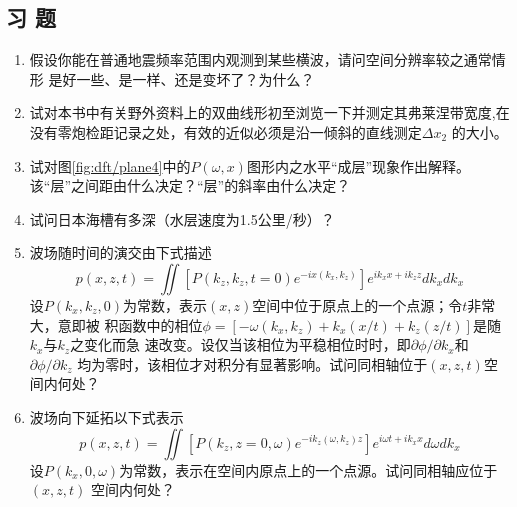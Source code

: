 \subsection{习 题}
\begin{enumerate}
\item
    假设你能在普通地震频率范围内观测到某些横波，请问空间分辨率较之通常情形
是好一些、是一样、还是变坏了？为什么？
\item 
    试对本书中有关野外资料上的双曲线形初至浏览一下并测定其弗莱涅带宽度,在
没有零炮检距记录之处，有效的近似必须是沿一倾斜的直线测定${\Delta x_{2}}$
的大小。
\item
试对图\ref{fig:dft/plane4}中的$P(\omega,x)$图形内之水平“成层”现象作出解释。
该“层”之间距由什么决定？“层”的斜率由什么决定？
\item 
试问日本海槽有多深（水层速度为1.5公里/秒）？
\item 
    波场随时间的演交由下式描述
\begin{equation*}
p(x,z,t)=\iint[P(k_z,k_z,t=0)e^{-ix(k_x,k_z)}]e^{ik_xx+ik_zz}dk_xdk_x
\end{equation*}
设$P(k_x,k_z,0)$为常数，表示$(x,z)$空间中位于原点上的一个点源；令$t$非常大，意即被
积函数中的相位$\phi=[-\omega(k_x,k_z)+k_x(x/t)+k_z(z/t)]$是随$k_x$与$k_z$之变化而急
速改变。设仅当该相位为平稳相位时时，即$\partial\phi/\partial k_x$和$\partial\phi/\partial k_z$
均为零时，该相位才对积分有显著影响。试问同相轴位于$(x,z,t)$空间内何处？
\item 波场向下延拓以下式表示
\begin{equation*}
p(x,z,t)=\iint[P(k_z,z=0,\omega)e^{-ik_z(\omega,k_z)z}]e^{i\omega t+ik_xx}d\omega dk_x
\end{equation*}
设$P(k_x,0,\omega)$为常数，表示在空间内原点上的一个点源。试问同相轴应位于$(x,z,t)$
空间内何处？
\end{enumerate}
